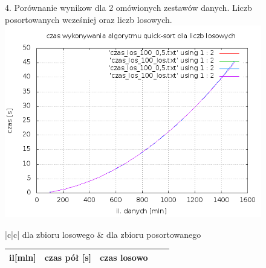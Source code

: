 \documentclass[a4paper,11pt]{report}
\begin{document}
\begin{figure}
  \begin{center}
  4. Porównanie wynikow dla 2 omówionych zestawów danych. Liczb posortowanych wcześniej oraz liczb losowych.
    \includegraphics[scale=0.5]{./czas_wszystkie.png}
    \label{fig:}
    \caption{}
          \begin{tabular}{|c|c|}
\hline
dla zbioru losowego & dla zbioru posortowanego \\
\hline

          \begin{tabular}{|l|c|c|c|r|}
\hline
il[mln] & czas pół [s] & czas losowo \\
\hline


\end{tabular}
\end{tabular}
\end{center}
\end{figure}
\end{document}
